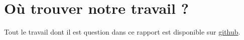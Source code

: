 \documentclass[12pt]{article}
\begin{document}
\section{Où trouver notre travail ?}

Tout le travail dont il est question dans ce rapport est disponible sur \href{https://github.com/antoinedenovembre/3d_reconstruction}{github}.

\newpage
\renewcommand{\refname}{Bibliographie}



\end{document}
